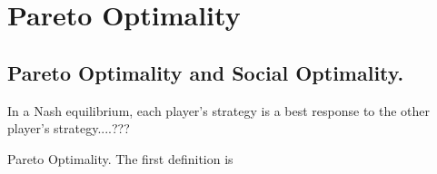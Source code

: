 \chapter{Pareto Optimality}

\section{Pareto Optimality and Social Optimality. \cite{kleinberg2010}}

In a Nash equilibrium, each player's strategy is a best response to the other player's strategy....???

Pareto Optimality. The first definition is 